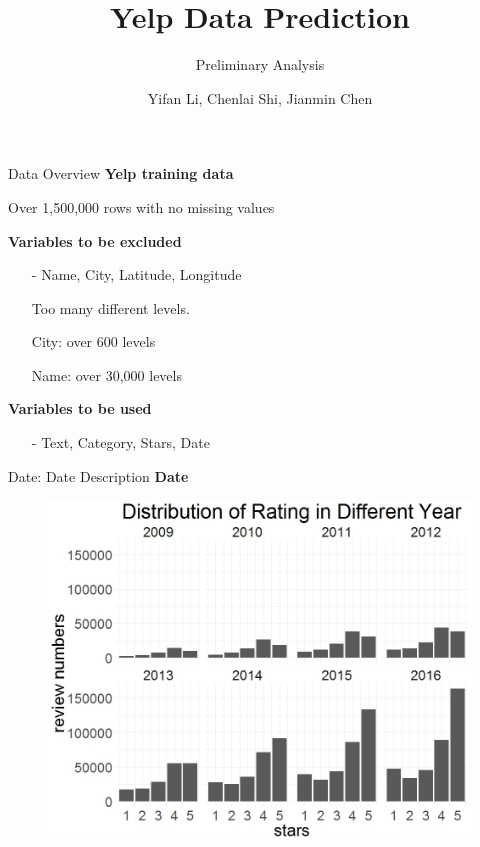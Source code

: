 \documentclass[10pt]{beamer}
\title{Yelp Data Prediction}
\subtitle{Preliminary Analysis}
\date{}
\author{Yifan Li, Chenlai Shi, Jianmin Chen}
\institute{Monday Group 1}
\begin{document}
\maketitle

\begin{frame}{Data Overview}
\textbf{Yelp training data} 

Over 1,500,000 rows with no missing values

\textbf{Variables to be excluded}
\begin{itemize}
    \item[-] Name, City, Latitude, Longitude
    
    Too many different levels.
    
    City: over 600 levels
    
    Name: over 30,000 levels
\end{itemize}

\textbf{Variables to be used}
\begin{itemize}
    \item[-] Text, Category, Stars, Date
\end{itemize}
\end{frame}

\begin{frame}{Date: Date Description}
\textbf{Date}
\begin{figure}
    \centering
    \includegraphics[scale=0.3]{date.jpeg}
\end{figure}    
\end{frame}
\end{document}
